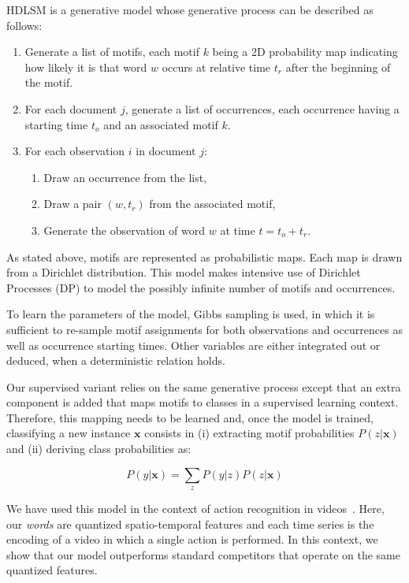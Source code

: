 HDLSM is a generative model whose generative process can be described as
follows:
\begin{enumerate}
\item Generate a list of motifs, each motif $k$ being a 2D probability map
indicating how likely it is that word $w$ occurs at relative time $t_r$ after
the beginning of the motif.
\item For each document $j$, generate a list of occurrences, each occurrence having
a starting time $t_o$ and an associated motif $k$.
\item For each observation $i$ in document $j$:
  \begin{enumerate}
  \item Draw an occurrence from the list,
  \item Draw a pair $(w, t_r)$ from the associated motif,
  \item Generate the observation of word $w$ at time $t = t_o + t_r$.
  \end{enumerate}
\end{enumerate}

As stated above, motifs are represented as probabilistic maps.
Each map is drawn from a Dirichlet distribution.
This model makes intensive use of Dirichlet Processes (DP) to model the
possibly infinite number of motifs and occurrences.

To learn the parameters of the model, Gibbs sampling is used, in which it
is sufficient to re-sample motif assignments for both observations and
occurrences as well as occurrence starting times.
Other variables are either integrated out or deduced, when a deterministic
relation holds.

Our supervised variant relies on the same generative process except that an
extra component is added that maps motifs to classes in a supervised learning
context.
Therefore, this mapping needs to be learned and, once the model is trained,
classifying a new instance $\mathbf{x}$ consists in
(i) extracting motif probabilities $P(z | \mathbf{x})$ and
(ii) deriving class probabilities as:

\begin{equation}
    P(y | \mathbf{x}) = \sum_z P(y | z) P(z | \mathbf{x})
\end{equation}

We have used this model in the context of action recognition in
videos~\cite{tavenard:hal-00872048}.
Here, our \emph{words} are quantized spatio-temporal features and each time series
is the encoding of a video in which a single action is performed.
In this context, we show that our
model outperforms standard competitors that operate on the same quantized
features.

